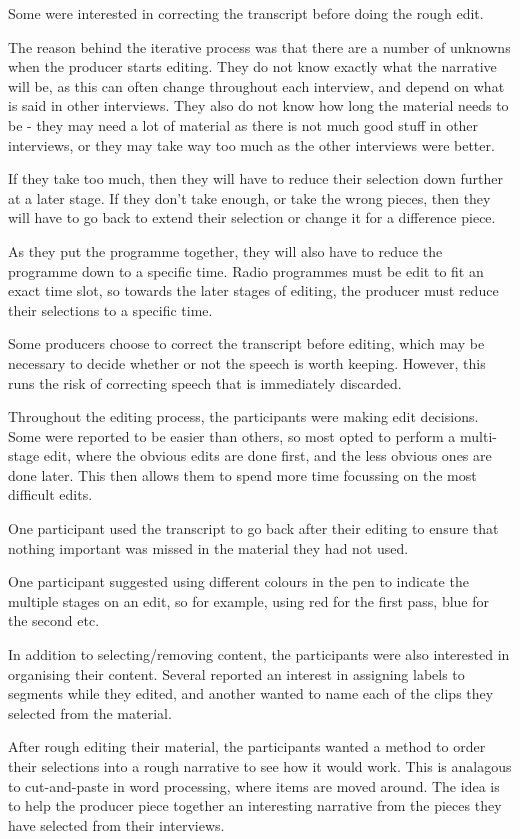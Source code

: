 Some were interested in correcting the transcript before doing the rough edit.

The reason behind the iterative process was that there are a number of unknowns when the producer starts editing. They
do not know exactly what the narrative will be, as this can often change throughout each interview, and depend on what
is said in other interviews. They also do not know how long the material needs to be - they may need a lot of material
as there is not much good stuff in other interviews, or they may take way too much as the other interviews were better.

If they take too much, then they will have to reduce their selection down further at a later stage. If they don't take
enough, or take the wrong pieces, then they will have to go back to extend their selection or change it for a
difference piece.

As they put the programme together, they will also have to reduce the programme down to a specific time. Radio
programmes must be edit to fit an exact time slot, so towards the later stages of editing, the producer must reduce
their selections to a specific time.

Some producers choose to correct the transcript before editing, which may be necessary to decide whether or not the
speech is worth keeping. However, this runs the risk of correcting speech that is immediately discarded.

Throughout the editing process, the participants were making edit decisions. Some were reported to be easier than
others, so most opted to perform a multi-stage edit, where the obvious edits are done first, and the less obvious ones
are done later. This then allows them to spend more time focussing on the most difficult edits.

One participant used the transcript to go back after their editing to ensure that nothing important was missed in the
material they had not used.

One participant suggested using different colours in the pen to indicate the multiple stages on an edit, so for
example, using red for the first pass, blue for the second etc.

In addition to selecting/removing content, the participants were also interested in organising their content. Several
reported an interest in assigning labels to segments while they edited, and another wanted to name each of the clips
they selected from the material.

After rough editing their material, the participants wanted a method to order their selections into a rough narrative
to see how it would work. This is analagous to cut-and-paste in word processing, where items are moved around. The idea
is to help the producer piece together an interesting narrative from the pieces they have selected from their
interviews.

